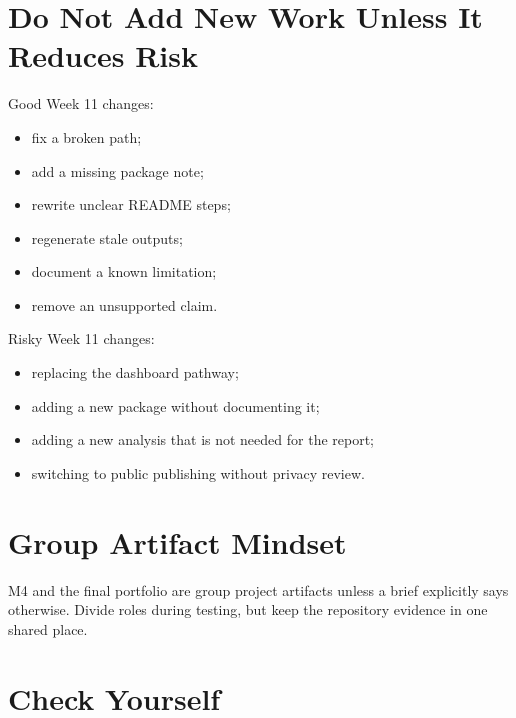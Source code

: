 \documentclass[
  letterpaper,
  DIV=11,
  numbers=noendperiod,
  oneside]{scrreprt}
\providecommand{\tightlist}{%
  \setlength{\itemsep}{0pt}\setlength{\parskip}{0pt}}
\begin{document}
\section*{Do Not Add New Work Unless It Reduces
Risk}\label{do-not-add-new-work-unless-it-reduces-risk}


Good Week 11 changes:

\begin{itemize}
\tightlist
\item
  fix a broken path;
\item
  add a missing package note;
\item
  rewrite unclear README steps;
\item
  regenerate stale outputs;
\item
  document a known limitation;
\item
  remove an unsupported claim.
\end{itemize}

Risky Week 11 changes:

\begin{itemize}
\tightlist
\item
  replacing the dashboard pathway;
\item
  adding a new package without documenting it;
\item
  adding a new analysis that is not needed for the report;
\item
  switching to public publishing without privacy review.
\end{itemize}

\section*{Group Artifact Mindset}\label{group-artifact-mindset}


M4 and the final portfolio are group project artifacts unless a brief
explicitly says otherwise. Divide roles during testing, but keep the
repository evidence in one shared place.

\section*{Check Yourself}\label{check-yourself-2}
\end{document}
